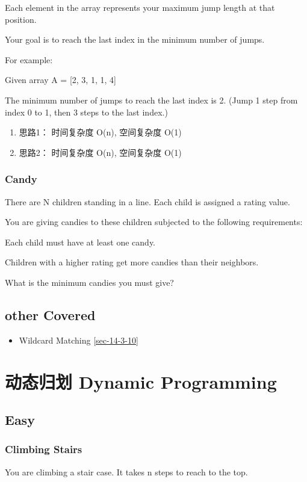 \documentclass[12pt]{book}
\begin{document}
Each element in the array represents your maximum jump length at that position.

Your goal is to reach the last index in the minimum number of jumps.

For example:

Given array A = [2, 3, 1, 1, 4]

The minimum number of jumps to reach the last index is 2. (Jump 1
step from index 0 to 1, then 3 steps to the last index.)
\begin{enumerate}
\item 思路1： 时间复杂度 O(n), 空间复杂度 O(1)
\label{sec-13-2-1-1}

\item 思路2： 时间复杂度 O(n), 空间复杂度 O(1)
\label{sec-13-2-1-2}
\end{enumerate}


\subsection{Candy}
\label{sec-13-2-2}
There are N children standing in a line. Each child is assigned a rating value.

You are giving candies to these children subjected to the following requirements:

Each child must have at least one candy.

Children with a higher rating get more candies than their neighbors.

What is the minimum candies you must give?

\section{other Covered}
\label{sec-13-3}
\begin{itemize}
\item Wildcard Matching
\ref{sec-14-3-10}
\end{itemize}

\chapter{动态归划 Dynamic Programming}
\label{sec-14}
\section{Easy}
\label{sec-14-1}
\subsection{Climbing Stairs}
\label{sec-14-1-1}
You are climbing a stair case. It takes n steps to reach to the top.
\end{document}
